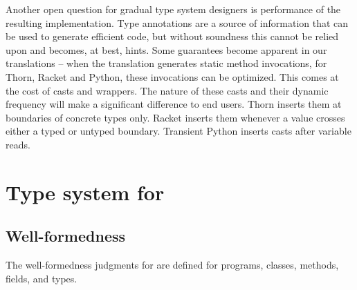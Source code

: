 \documentclass[runnningheads]{tex/llncs}
\begin{document}
Another open question for gradual type system designers is performance of
the resulting implementation. Type annotations are a source of information
that can be used to generate efficient code, but without soundness this
cannot be relied upon and becomes, at best, hints.  Some guarantees become
apparent in our translations -- when the translation generates static method
invocations, for Thorn, Racket and Python, these invocations can be
optimized. This comes at the cost of casts and wrappers.  The nature of
these casts and their dynamic frequency will make a significant difference
to end users.  Thorn inserts them at boundaries of concrete types
only. Racket inserts them whenever a value crosses either a typed or untyped
boundary. Transient Python inserts casts after variable reads.





\newpage
\appendix
\section{Type system for \kafka}%
\label{appendix:kafka}
\subsection{Well-formedness}

The well-formedness judgments for \kafka are defined for programs, classes, methods, fields, and types.

\end{document}
